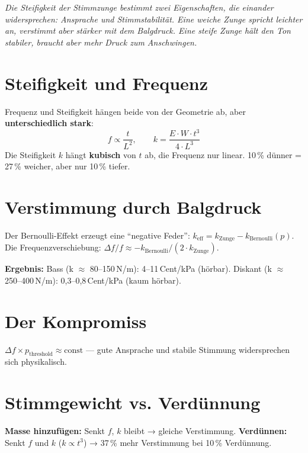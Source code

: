 \documentclass[11pt,a4paper]{article}
\begin{document}
\hbmaketitle

{\small\itshape Die Steifigkeit der Stimmzunge bestimmt zwei Eigenschaften, die einander widersprechen: Ansprache und Stimmstabilität. Eine weiche Zunge spricht leichter an, verstimmt aber stärker mit dem Balgdruck. Eine steife Zunge hält den Ton stabiler, braucht aber mehr Druck zum Anschwingen.}

\section{Steifigkeit und Frequenz}

Frequenz und Steifigkeit hängen beide von der Geometrie ab, aber \textbf{unterschiedlich stark}:
\begin{equation}
f \propto \frac{t}{L^2}, \qquad k = \frac{E \cdot W \cdot t^3}{4 \cdot L^3}
\end{equation}
Die Steifigkeit $k$ hängt \textbf{kubisch} von $t$ ab, die Frequenz nur linear. 10\,\% dünner = 27\,\% weicher, aber nur 10\,\% tiefer.

\section{Verstimmung durch Balgdruck}

Der Bernoulli-Effekt erzeugt eine ``negative Feder'': $k_\text{eff} = k_\text{Zunge} - k_\text{Bernoulli}(p)$. Die Frequenzverschiebung: $\Delta f/f \approx -k_\text{Bernoulli}/(2 \cdot k_\text{Zunge})$.

\begin{keybox}
\textbf{Ergebnis:} Bass (k $\approx$ 80--150\,N/m): 4--11\,Cent/kPa (hörbar). Diskant (k $\approx$ 250--400\,N/m): 0,3--0,8\,Cent/kPa (kaum hörbar).
\end{keybox}

\section{Der Kompromiss}

$\Delta f \times p_\text{threshold} \approx \text{const}$ --- gute Ansprache und stabile Stimmung widersprechen sich physikalisch.

\section{Stimmgewicht vs. Verdünnung}

\textbf{Masse hinzufügen:} Senkt $f$, $k$ bleibt → gleiche Verstimmung. \textbf{Verdünnen:} Senkt $f$ und $k$ ($k \propto t^3$) → 37\,\% mehr Verstimmung bei 10\,\% Verdünnung.
\end{document}
